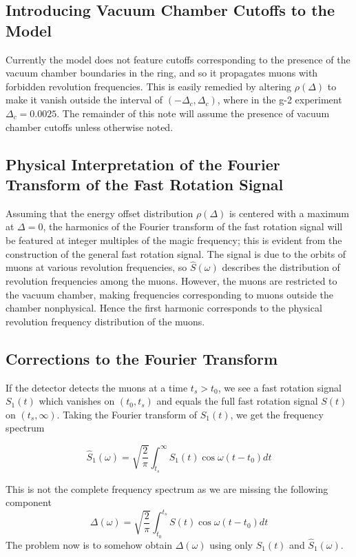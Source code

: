\subsection{Introducing Vacuum Chamber Cutoffs to the Model}
Currently the model does not feature cutoffs corresponding to the presence of the vacuum chamber boundaries in the ring, and so it propagates muons with forbidden revolution frequencies. This is easily remedied by altering $\rho(\Delta)$ to make it vanish outside the interval of $(-\Delta_c,\Delta_c)$, where in the g-2 experiment $\Delta_c=0.0025$. The remainder of this note will assume the presence of vacuum chamber cutoffs unless otherwise noted.

\subsection{Physical Interpretation of the Fourier Transform of the Fast Rotation Signal}

Assuming that the energy offset distribution $\rho(\Delta)$ is centered with a maximum at $\Delta=0$, the harmonics of the Fourier transform of the fast rotation signal will be featured at integer multiples of the magic frequency; this is evident from the construction of the general fast rotation signal. The signal is due to the orbits of muons at various revolution frequencies, so $\hat{S}(\omega)$ describes the distribution of revolution frequencies among the muons. However, the muons are restricted to the vacuum chamber, making frequencies corresponding to muons outside the chamber nonphysical. Hence the first harmonic corresponds to the physical revolution frequency distribution of the muons.

\subsection{Corrections to the Fourier Transform}

If the detector detects the muons at a time $t_s>t_0$, we see a fast rotation signal $S_1(t)$ which vanishes on $(t_0,t_s)$ and equals the full fast rotation signal $S(t)$ on $(t_s,\infty)$. Taking the Fourier transform of $S_1(t)$, we get the frequency spectrum

\begin{equation}
\hat{S}_1(\omega)=\sqrt{\frac{2}{\pi}}\int^{\infty}_{t_s}S_1(t)\cos\omega(t-t_0)dt
\label{eq:firstapprox}
\end{equation}

This is not the complete frequency spectrum as we are missing the following component 
\begin{equation}
\Delta(\omega)=\sqrt{\frac{2}{\pi}}\int^{t_s}_{t_0}S(t)\cos\omega(t-t_0)dt
\label{eq:Delta}
\end{equation} The problem now is to somehow obtain $\Delta(\omega)$ using only $S_1(t)$ and $\hat{S}_1(\omega)$.

